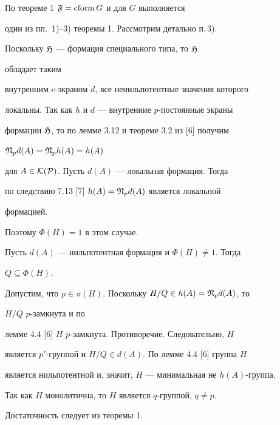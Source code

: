  


\begin{pf} 


По теореме 1 $\frak F=\operatorname{cform} G$ и для $G$ выполняется 


один из пп.\, 1)--3) теоремы 1. Рассмотрим детально п.\,3). 


Поскольку $\frak H$ --- формация специального типа, то $\frak H$ 


обладает таким 


внутренним $c$-экраном $d$, все ненильпотентные значения которого 


локальны. Так как $h$ и $d$ --- внутренние $p$-постоянные экраны 


формации $\frak H$, то по лемме 3.12 и теореме 3.2 из [6] получим 


$\frak N_p d(A)=\frak N_p h(A)=h(A)$ 


для $A\in\cal K(P)$. Пусть $d(A)$ --- локальная формация. Тогда 


по следствию 7.13 [7] $h(A)=\frak N_p d(A)$ является локальной 


формацией. 


Поэтому $\Phi(H)=1$ в этом случае. 


 


Пусть $d(A)$ --- нильпотентная формация и $\Phi(H)\ne1$. Тогда 


$Q\subseteq\Phi(H)$. 


Допустим, что $p\in\pi(H)$. Поскольку $H/Q\in h(A)=\frak N_p d(A)$, то 


$H/Q$\; $p$-замкнута и по 


лемме 4.4 [6] $H$\; $p$-замкнута. Противоречие. Следовательно, $H$ 


является $p'$-группой и $H/Q\in d(A)$. По лемме 4.4 [6] группа $H$ 


является нильпотентной и, значит, $H$ --- минимальная не $h(A)$-группа. 


Так как $H$ монолитична, то $H$ является $q$-группой, $q\ne p$. 


\smallskip 


 


Достаточность следует из теоремы 1. 


\end{pf} 


 


